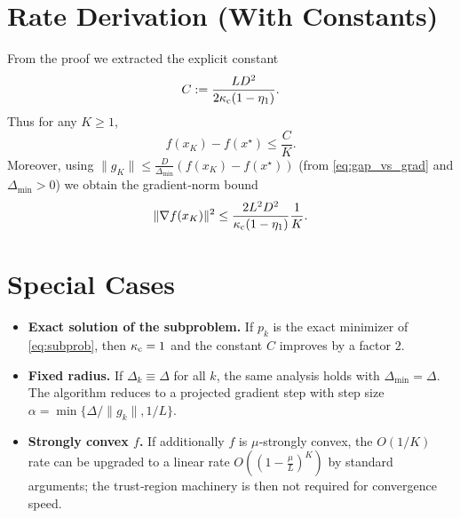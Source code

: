 \documentclass{article}
\begin{document}
\section*{Rate Derivation (With Constants)}
From the proof we extracted the explicit constant
\[
C:=\frac{L D^2}{2\kappa_{\rm c}(1-\eta_1)}.
\]
Thus for any $K\ge1$,
\[
f(x_K)-f(x^\star)\le \frac{C}{K}.
\]
Moreover, using $\|g_K\|\le \frac{D}{\Delta_{\min}}(f(x_K)-f(x^\star))$ (from \eqref{eq:gap_vs_grad} and $\Delta_{\min}>0$) we obtain the gradient‑norm bound
\[
\|\nabla f(x_K)\|^2 \le \frac{2L^2 D^2}{\kappa_{\rm c}(1-\eta_1)}\frac{1}{K}.
\]

\section*{Special Cases}
\begin{itemize}
\item \textbf{Exact solution of the subproblem.} If $p_k$ is the exact minimizer of \eqref{eq:subprob}, then $\kappa_{\rm c}=1$ and the constant $C$ improves by a factor $2$.
\item \textbf{Fixed radius.} If $\Delta_k\equiv\Delta$ for all $k$, the same analysis holds with $\Delta_{\min}=\Delta$. The algorithm reduces to a projected gradient step with step size $\alpha=\min\{\Delta/\|g_k\|,1/L\}$.
\item \textbf{Strongly convex $f$.} If additionally $f$ is $\mu$‑strongly convex, the $O(1/K)$ rate can be upgraded to a linear rate $O((1-\frac{\mu}{L})^K)$ by standard arguments; the trust‑region machinery is then not required for convergence speed.
\end{itemize}
\end{document}
